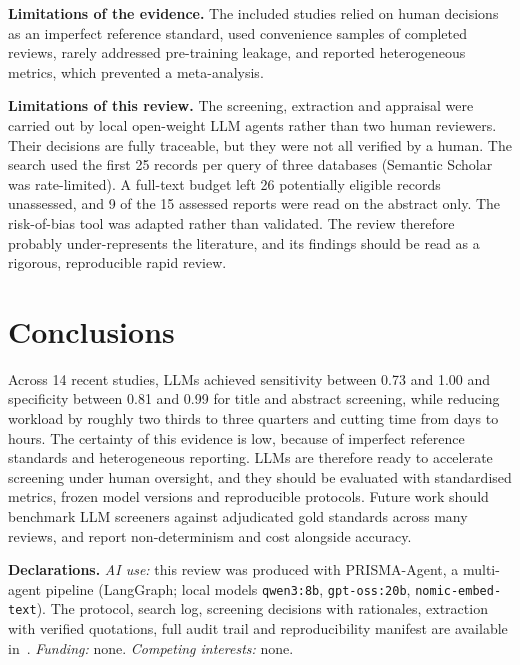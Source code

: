 \documentclass[12pt,a4paper]{article}
\begin{document}
\textbf{Limitations of the evidence.} The included studies relied on human decisions as an
imperfect reference standard, used convenience samples of completed reviews, rarely addressed
pre-training leakage, and reported heterogeneous metrics, which prevented a meta-analysis.

\textbf{Limitations of this review.} The screening, extraction and appraisal were carried out
by local open-weight LLM agents rather than two human reviewers. Their decisions are fully
traceable, but they were not all verified by a human. The search used the first 25 records per
query of three databases (Semantic Scholar was rate-limited). A full-text budget left 26
potentially eligible records unassessed, and 9 of the 15 assessed reports were read on the
abstract only. The risk-of-bias tool was adapted rather than validated. The review therefore
probably under-represents the literature, and its findings should be read as a rigorous,
reproducible rapid review.

\section{Conclusions}
Across 14 recent studies, LLMs achieved sensitivity between 0.73 and 1.00 and specificity
between 0.81 and 0.99 for title and abstract screening, while reducing workload by roughly
two thirds to three quarters and cutting time from days to hours. The certainty of this evidence
is low, because of imperfect reference standards and heterogeneous reporting. LLMs are
therefore ready to accelerate screening under human oversight, and they should be evaluated
with standardised metrics, frozen model versions and reproducible protocols. Future work should
benchmark LLM screeners against adjudicated gold standards across many reviews, and report
non-determinism and cost alongside accuracy.

\textbf{Declarations.} \emph{AI use:} this review was produced with PRISMA-Agent, a
multi-agent pipeline (LangGraph; local models \texttt{qwen3:8b}, \texttt{gpt-oss:20b},
\texttt{nomic-embed-text}). The protocol, search log, screening decisions with rationales,
extraction with verified quotations, full audit trail and reproducibility manifest are
available in~\cite{repo}. \emph{Funding:} none. \emph{Competing interests:} none.
\end{document}
